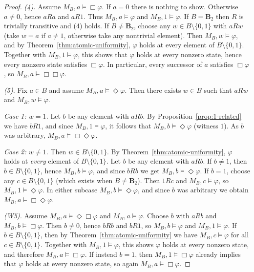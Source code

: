 \documentclass[11pt]{amsart}
\theoremstyle{definition}
\theoremstyle{plain}
\newcommand{\Btwo}{\mathbf{B}_2}
\begin{document}
\begin{proof}
\emph{(4).}
Assume $M_B,a\models \Box\varphi$.
If $a=0$ there is nothing to show. Otherwise $a\ne 0$, hence $aRa$ and $aR1$.
Thus $M_B,a\models\varphi$ and $M_B,1\models\varphi$.
If $B=\Btwo$ then $R$ is trivially transitive and (4) holds.
If $B\ne\Btwo$, choose any $w\in B\setminus\{0,1\}$ with $aRw$ (take $w=a$ if $a\ne 1$, otherwise take any
nontrivial element). Then $M_B,w\models\varphi$, and by Theorem~\ref{thm:atomic-uniformity},
$\varphi$ holds at every element of $B\setminus\{0,1\}$.
Together with $M_B,1\models\varphi$, this shows that $\varphi$ holds at every nonzero state, hence every
nonzero state satisfies $\Box\varphi$. In particular, every successor of $a$ satisfies $\Box\varphi$, so
$M_B,a\models \Box\Box\varphi$.

\medskip\noindent
\emph{(5).}
Fix $a\in B$ and assume $M_B,a\models \Diamond\varphi$.
Then there exists $w\in B$ such that $aRw$ and $M_B,w\models \varphi$.

\smallskip\noindent\emph{Case 1: $w=1$.}
Let $b$ be any element with $aRb$.
By Proposition~\ref{prop:1-related} we have $bR1$, and since $M_B,1\models\varphi$, it follows that
$M_B,b\models\Diamond\varphi$ (witness $1$).  As $b$ was arbitrary, $M_B,a\models \Box\Diamond\varphi$.

\smallskip\noindent\emph{Case 2: $w\neq 1$.}
Then $w\in B\setminus\{0,1\}$.
By Theorem~\ref{thm:atomic-uniformity}, $\varphi$ holds at \emph{every} element of $B\setminus\{0,1\}$.
Let $b$ be any element with $aRb$.
If $b\neq 1$, then $b\in B\setminus\{0,1\}$, hence $M_B,b\models\varphi$, and since $bRb$ we get
$M_B,b\models\Diamond\varphi$.
If $b=1$, choose any $c\in B\setminus\{0,1\}$ (which exists when $B\ne \Btwo$). Then $1Rc$ and $M_B,c\models\varphi$,
so $M_B,1\models\Diamond\varphi$.
In either subcase $M_B,b\models\Diamond\varphi$, and since $b$ was arbitrary we obtain
$M_B,a\models\Box\Diamond\varphi$.

\medskip\noindent
\emph{(W5).}
Assume $M_B,a\models\Diamond\Box\varphi$ and $M_B,a\models\varphi$.
Choose $b$ with $aRb$ and $M_B,b\models \Box\varphi$.
Then $b\ne 0$, hence $bRb$ and $bR1$, so $M_B,b\models\varphi$ and $M_B,1\models\varphi$.
If $b\in B\setminus\{0,1\}$, then by Theorem~\ref{thm:atomic-uniformity} we have
$M_B,c\models\varphi$ for all $c\in B\setminus\{0,1\}$.
Together with $M_B,1\models\varphi$, this shows $\varphi$ holds at every nonzero state, and therefore
$M_B,a\models\Box\varphi$.
If instead $b=1$, then $M_B,1\models\Box\varphi$ already implies that $\varphi$ holds at every nonzero state,
so again $M_B,a\models\Box\varphi$.


\end{proof}
\end{document}
